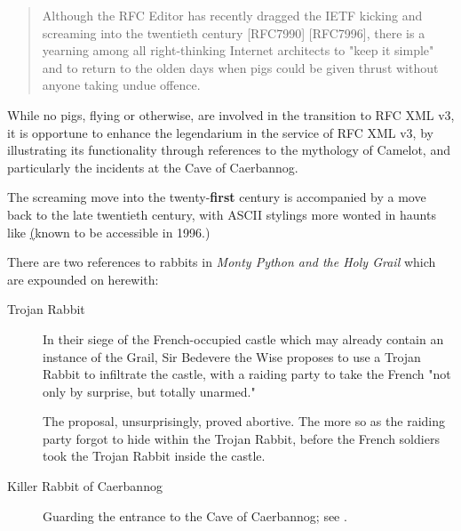 \documentclass{metanorma}
\begin{document}


\begin{quote}
  Although the RFC Editor has recently dragged the IETF kicking and
  screaming into the twentieth century [RFC7990] [RFC7996], there is a
  yearning among all right-thinking Internet architects to "keep it
  simple" and to return to the olden days when pigs could be given
  thrust without anyone taking undue offence.
\end{quote}


While no pigs, flying or otherwise, are involved in the transition
to RFC XML v3, it is opportune to enhance the 
legendarium in the service of RFC XML v3, by illustrating its
functionality through references to the mythology of Camelot, and
particularly the incidents at the Cave of Caerbannog.


The screaming move into the twenty-\textbf{first} century is accompanied by
a move back to the late twentieth century, with ASCII stylings more
wonted in haunts like \href{ftp://ftp.wwa.com/pub/Scarecrow} (known to be
accessible in 1996.)


There are two references to rabbits in
\textit{Monty Python and the Holy Grail} which are expounded on
herewith:


\begin{description}
  \item[Trojan Rabbit]
    In their siege of the French-occupied castle which may already
    contain an instance of the Grail, Sir Bedevere the Wise proposes to
    use a Trojan Rabbit to infiltrate the castle, with a raiding party
    to take the French "not only by surprise, but totally unarmed."

    The proposal, unsurprisingly, proved abortive. The more so as the
    raiding party forgot to hide within the Trojan Rabbit, before the
    French soldiers took the Trojan Rabbit inside the castle.

  \item[Killer Rabbit of Caerbannog]
    Guarding the entrance to the Cave of Caerbannog; see .

\end{description}
\end{document}
